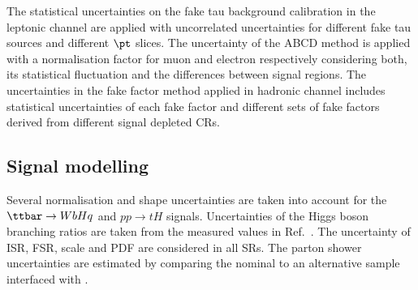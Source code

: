 \documentclass[PAPER, coverpage, atlasdraft=true, texlive=2016, UKenglish]{\ATLASLATEXPATH atlasdoc}
\begin{document}
The statistical uncertainties on the fake tau background calibration in the leptonic channel are applied with uncorrelated uncertainties for different fake tau sources and
different $\pt$ slices. The uncertainty of the ABCD method is applied with a normalisation factor for muon and electron respectively considering both,
its statistical fluctuation and the differences between signal regions.
The uncertainties in the fake factor method applied in hadronic channel includes statistical uncertainties of each fake factor and different sets of fake factors derived from different signal depleted CRs.

\subsection{Signal modelling}
\label{sec:syst_sigmodeling}

Several normalisation and shape uncertainties are taken into account for the $\Hq$ and $pp\to tH$ signals.
Uncertainties of the Higgs boson branching ratios are taken from the measured values in Ref.~\cite{Zyla:2020zbs}.
The uncertainty of ISR, FSR, scale and PDF are considered in all SRs. The parton shower uncertainties are estimated by comparing
the nominal to an alternative sample interfaced with {}.
\end{document}
